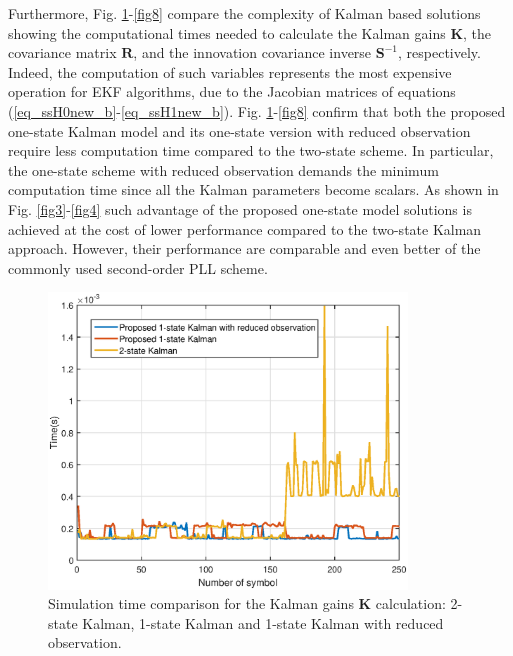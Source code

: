 Furthermore, Fig. \ref{fig5}-\ref{fig8} compare the complexity of Kalman based solutions showing the computational times needed to calculate the Kalman gains $\mathbf{K}$, the covariance matrix  $\mathbf{R}$, and the innovation covariance inverse $\mathbf{S}^{-1}$, respectively. Indeed, the computation of such variables represents the most expensive operation for EKF algorithms, due to the Jacobian matrices of equations (\ref{eq_ssH0new_b}-\ref{eq_ssH1new_b}).
Fig. \ref{fig5}-\ref{fig8} confirm that both the proposed one-state Kalman model and its one-state version with reduced observation require less computation time compared to the two-state scheme. In particular, the one-state scheme with reduced observation demands the minimum computation time since all the Kalman parameters become scalars. As shown in Fig. \ref{fig3}-\ref{fig4} such advantage of the proposed one-state model solutions is achieved at the cost of lower performance compared to the two-state Kalman approach. However, their performance are comparable and even better of the commonly used second-order PLL scheme.
\begin{figure}
	\includegraphics[width=0.85\textwidth]{figures/fig_red_kalman/Fig5.eps}
	\caption{Simulation time comparison for the Kalman gains $\mathbf{K}$ calculation: 2-state Kalman, 1-state Kalman and 1-state Kalman with reduced observation.}
	\label{fig5}      
\end{figure}
